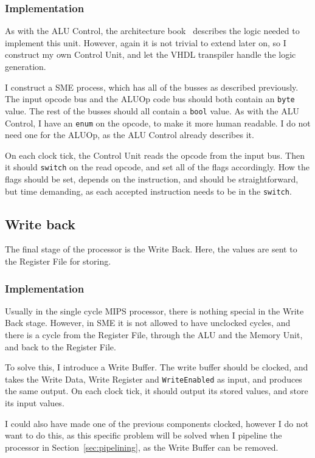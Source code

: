 \subsubsection*{Implementation}
As with the ALU Control, the architecture book~\cite{ref:ark} describes the
logic needed to implement this unit. However, again it is not trivial to extend
later on, so I construct my own Control Unit, and let the VHDL transpiler
handle the logic generation.

I construct a SME process, which has all of the busses as described
previously. The input opcode bus and the ALUOp code bus should both contain an
\texttt{byte} value. The rest of the busses should all contain a \texttt{bool}
value. As with the ALU Control, I have an \texttt{enum} on the opcode, to make
it more human readable. I do not need one for the ALUOp, as the ALU Control
already describes it.

On each clock tick, the Control Unit reads the opcode from the input bus. Then
it should \texttt{switch} on the read opcode, and set all of the flags
accordingly. How the flags should be set, depends on the instruction, and
should be straightforward, but time demanding, as each accepted instruction
needs to be in the \texttt{switch}.

\subsection{Write back}
The final stage of the processor is the Write Back. Here, the values are sent
to the Register File for storing.

\subsubsection*{Implementation}
Usually in the single cycle MIPS processor, there is nothing special in the
Write Back stage. However, in SME it is not allowed to have unclocked cycles,
and there is a cycle from the Register File, through the ALU and the Memory
Unit, and back to the Register File.

To solve this, I introduce a Write Buffer. The write buffer should be clocked,
and takes the Write Data, Write Register and \texttt{WriteEnabled} as input,
and produces the same output. On each clock tick, it should output its stored
values, and store its input values.

I could also have made one of the previous components clocked, however I do
not want to do this, as this specific problem will be solved when I pipeline
the processor in Section~\ref{sec:pipelining}, as the Write Buffer can be
removed.

